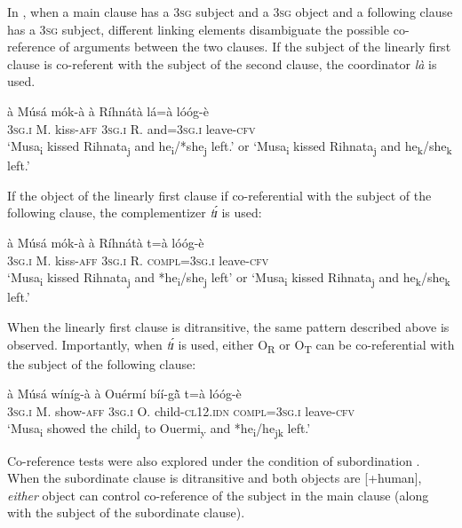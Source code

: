 \documentclass[output=paper]{langsci/langscibook}
\begin{document}
In , when a main clause has a 3\textsc{sg} subject and a 3\textsc{sg} object and a following clause has a 3\textsc{sg} subject, different linking elements disambiguate the possible co-reference of arguments between the two clauses. If the subject of the linearly first clause is co-referent with the subject of the second clause, the coordinator \textit{là} is used.

\ea
\label{ex:37.pacchiarotti}
\gll à    Músá  mók-à    à    Ríhnátà  lá=à      lóóg-è\\
\textsc{3sg.i}    M.  kiss-\textsc{aff}  \textsc{3sg.i} R.    and=\textsc{3sg.i}    leave-\textsc{cfv}\\
\glt `Musa\textsubscript{i} kissed Rihnata\textsubscript{j} and he\textsubscript{i}/*she\textsubscript{j} left.' or `Musa\textsubscript{i} kissed Rihnata\textsubscript{j} and he\textsubscript{k}/she\textsubscript{k} left.'
\z

If the object of the linearly first clause if co-referential with the subject of the following clause, the complementizer \textit{tɪ́} is used:

\ea
\label{ex:38.pacchiarotti}
\gll à    Músá  mók-à    à    Ríhnátà  t=à        lóóg-è\\
\textsc{3sg.i}    M.  kiss-\textsc{aff}  \textsc{3sg.i}    R.    \textsc{compl=3sg.i}      leave-\textsc{cfv}\\
\glt `Musa\textsubscript{i} kissed Rihnata\textsubscript{j} and *he\textsubscript{i}/she\textsubscript{j} left' or `Musa\textsubscript{i} kissed Rihnata\textsubscript{j} and he\textsubscript{k}/she\textsubscript{k} left.'
\z

When the linearly first clause is ditransitive, the same pattern described above is observed. Importantly, when \textit{tɪ́} is used, either O\textsubscript{R} or O\textsubscript{T} can be co-referential with the subject of the following clause:

\ea
\label{ex:39.pacchiarotti}
\gll à    Músá  wíníg-à  à    Ouérmí  bíí-g\`{ã}  t=à      lóóg-è \\     
\textsc{3sg.i}    M.  show-\textsc{aff}  \textsc{3sg.i}    O.    child-\textsc{cl12.idn} \textsc{  compl=3sg.i}        leave-\textsc{cfv}\\
\glt `Musa\textsubscript{i}  showed the child\textsubscript{j} to Ouermi\textsubscript{y} and *he\textsubscript{i}/he\textsubscript{jk} left.'
\z

Co-reference tests were also explored under the condition of subordination . When the subordinate clause is ditransitive and both objects are [+human], \textit{either} object can control co-reference of the subject in the main clause (along with the subject of the subordinate clause).
\end{document}
